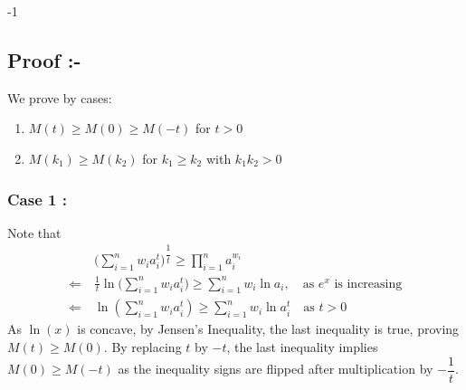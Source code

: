 -1\documentclass[12pt]{article}
\begin{document}
	\pagebreak 


\subsection{Proof :-}
\Large{We prove by cases:
\begin{enumerate}
	\item $M(t)\ge M(0)\ge M(-t)$ for $t>0$
	\item $M(k_1)\ge M(k_2)$ for $k_1 \ge k_2$ with $k_1k_2>0$
\end{enumerate} 
\subsubsection{Case 1 :}
Note that
\begin{align*}
&\ \displaystyle{\Bigg(\sum\limits_{i=1}^n w_ia_i^{t} \Bigg)^{\dfrac{1}{t}} } \ge  \displaystyle{\prod\limits_{i=1}^n a_i^{w_i}}\\
\Longleftarrow &\ \frac{1}{t} \ln\Bigg( \sum_{i=1}^n w_i a_i^{t} \Bigg)  \ge \sum_{i=1}^n w_i \ln{a_i}, \quad \text{as } e^x \text{ is increasing} \\
 \Longleftarrow &\ \ln\left( \sum_{i=1}^n w_i a_i^{t} \right) \ge \sum_{i=1}^n w_i \ln{a_i^t} \quad\text{as } t>0
\end{align*}As $\ln(x)$ is concave, by Jensen's Inequality, the last inequality is true, proving $M(t)\ge M(0)$. By replacing $t$ by $-t$, the last inequality implies $M(0)\ge M(-t)$ as the inequality signs are flipped after multiplication by $-\dfrac{1}{t}$.

}
\end{document}
